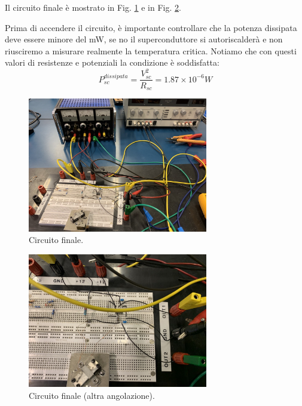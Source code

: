\documentclass[../main/main.tex]{subfiles}
\begin{document}
Il circuito finale è mostrato in Fig. \ref{fig:4_2} e in Fig. \ref{fig:4_3}.

\begin{remind}{}{}
    Prima di accendere il circuito, è importante controllare che la potenza dissipata deve essere minore del mW, se no il superconduttore si autoriscalderà e non riusciremo a misurare realmente la temperatura critica. Notiamo che con questi valori di resistenze e potenziali la condizione è soddisfatta:
    \begin{equation*}
      P_{sc}^{dissipata} = \frac{V_{sc}^2}{R_{sc}} = 1.87 \times 10^{-6} W
    \end{equation*}
\end{remind}


\begin{figure}[h!]
\centering
\includegraphics[width=0.7\textwidth]{../lessons/image/04/2.jpg}
\caption{\label{fig:4_2} Circuito finale.}
\end{figure}

\begin{figure}[h!]
\centering
\includegraphics[width=0.7\textwidth]{../lessons/image/04/3.jpg}
\caption{\label{fig:4_3} Circuito finale (altra angolazione).}
\end{figure}
\end{document}
